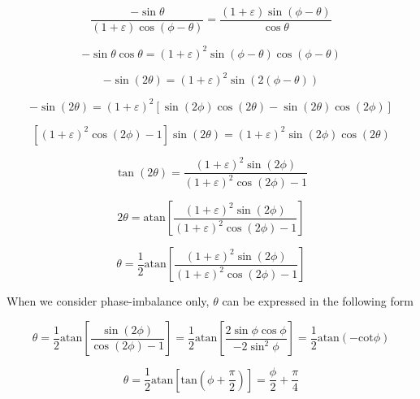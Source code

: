 \documentclass{article}
\begin{document}
\begin{equation}
	\frac{-\sin\theta}{(1+\varepsilon)\cos(\phi-\theta)} = \frac{(1+\varepsilon)\sin(\phi-\theta)}{\cos\theta}
\end{equation}

\begin{equation}
	-\sin\theta\cos\theta = (1+\varepsilon)^2\sin(\phi-\theta)\cos(\phi-\theta)
\end{equation}

\begin{equation}
	-\sin(2\theta) = (1+\varepsilon)^2\sin(2(\phi-\theta))
\end{equation}

\begin{equation}
	-\sin(2\theta)=(1+\varepsilon)^2\left[\sin(2\phi)\cos(2\theta) - \sin(2\theta)\cos(2\phi)\right]
\end{equation}

\begin{equation}
	\left[(1+\varepsilon)^2\cos(2\phi)-1\right]\sin(2\theta)=(1+\varepsilon)^2\sin(2\phi)\cos(2\theta)
\end{equation}

\begin{equation}
	\tan(2\theta)=\frac{(1+\varepsilon)^2\sin(2\phi)}{(1+\varepsilon)^2\cos(2\phi)-1}
\end{equation}

\begin{equation}
	2\theta = \text{atan}\left[\frac{(1+\varepsilon)^2\sin(2\phi)}{(1+\varepsilon)^2\cos(2\phi)-1}\right]
\end{equation}

\begin{equation}
	\theta = \frac{1}{2}\text{atan}\left[\frac{(1+\varepsilon)^2\sin(2\phi)}{(1+\varepsilon)^2\cos(2\phi)-1}\right]
\end{equation}

When we consider phase-imbalance only, $\theta$ can be expressed in the following form

\begin{equation}
	\theta = \frac{1}{2}\text{atan}\left[\frac{\sin(2\phi)}{\cos(2\phi)-1}\right] = \frac{1}{2}\text{atan}\left[\frac{2\sin\phi\cos\phi}{-2\sin^2\phi}\right] = \frac{1}{2}\text{atan}(-\text{cot}\phi)
\end{equation}

\begin{equation}
	\theta = \frac{1}{2}\text{atan}\left[\text{tan}\left(\phi+\frac{\pi}{2}\right)\right] = \frac{\phi}{2}+\frac{\pi}{4}
\end{equation}
\end{document}
